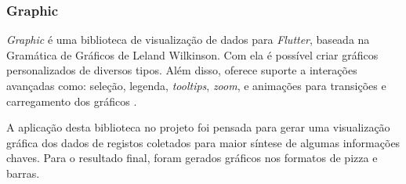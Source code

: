 \subsubsection{Graphic}

\textit{Graphic} é uma biblioteca de visualização de dados para \textit{Flutter}, 
baseada na Gramática de Gráficos de Leland Wilkinson. Com ela é possível criar gráficos 
personalizados de diversos tipos. Além disso, oferece suporte 
a interações avançadas como: seleção, legenda, \textit{tooltips}, \textit{zoom}, e animações 
para transições e carregamento dos gráficos \cite{graphic_flutter}.

A aplicação desta biblioteca no projeto foi pensada para gerar uma visualização gráfica dos dados de registos coletados para maior síntese de algumas informações chaves.
Para o resultado final, foram gerados gráficos nos formatos de pizza e barras.

